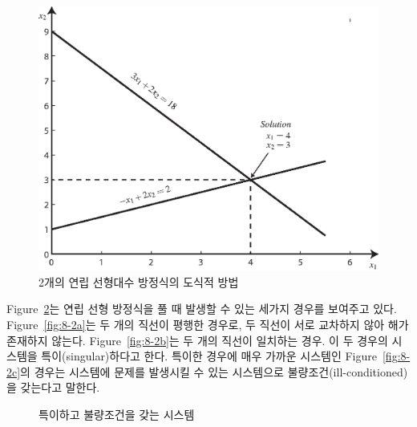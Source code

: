 \begin{figure}[!hbpt]
\centering
\includegraphics[keepaspectratio=true,width=0.7\linewidth]{figs2/p8_1.eps}
\caption{2개의 연립 선형대수 방정식의 도식적 방법}
\label{fig:8-1}
\end{figure}
Figure~\ref{fig:8-2}는 연립 선형 방정식을 풀 때 발생할 수 있는 세가지 경우를 보여주고 있다. Figure~\ref{fig:8-2a}는 두 개의 직선이 평행한 경우로, 두 직선이 서로 교차하지 않아 해가 존재하지 않는다. Figure~\ref{fig:8-2b}는 두 개의 직선이 일치하는 경우. 이 두 경우의 시스템을 특이(singular)하다고 한다. 특이한 경우에 매우 가까운 시스템인 Figure~\ref{fig:8-2c}의 경우는 시스템에 문제를 발생시킬 수 있는 시스템으로 불량조건(ill-conditioned)을 갖는다고 말한다.
\begin{figure}[!hbpt]
\centering
{}
\caption{특이하고 불량조건을 갖는 시스템}
\label{fig:8-2}
\end{figure}

